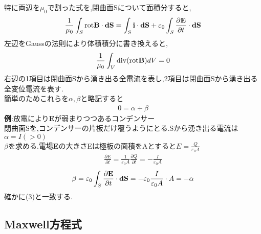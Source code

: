 \documentclass{jsarticle}
\begin{document}
特に両辺を$\mu_0$で割った式を,閉曲面Sについて面積分すると,
\begin{eqnarray*}
\frac{1}{\mu_0} \int_{S} {\rm rot} {\bf B} \cdot {\bf dS} = \int_{S} {\bf i} \cdot {\bf dS} + \varepsilon_0 \int_{S} \frac{\partial {\bf E}}{\partial t} \cdot {\bf dS}
\end{eqnarray*}
左辺をGaussの法則により体積積分に書き換えると,
\begin{eqnarray*}
\frac{1}{\mu_0} \int_{V} {\rm div}({\rm rot} {\bf B}) dV = 0
\end{eqnarray*}
右辺の1項目は閉曲面Sから湧き出る全電流を表し,2項目は閉曲面Sから湧き出る全変位電流を表す. \\
簡単のためこれらを$\alpha,\beta$と略記すると
\begin{eqnarray}
0=\alpha + \beta
\end{eqnarray}
{\bf 例}:放電により{\bf E}が弱まりつつあるコンデンサー \\
閉曲面Sを,コンデンサーの片板だけ覆うようにとる.Sから湧き出る電流は$\alpha = I(>0)$ \\
$\beta$を求める.電場{\bf E}の大きさEは極板の面積をAとすると$E=\frac{Q}{\varepsilon_0 A}$ \\
\begin{eqnarray*}
\frac{\partial E}{\partial t} = \frac{1}{\varepsilon_0 A} \frac{\partial Q}{\partial t} = - \frac{I}{\varepsilon_0 A}
\end{eqnarray*}
\begin{eqnarray*}
\beta = \varepsilon_0 \int_{S} \frac{\partial {\bf E}}{\partial t} \cdot {\bf dS} = - \varepsilon_0 \frac{I}{\varepsilon_0 A} \cdot A = -\alpha
\end{eqnarray*}
確かに(3)と一致する.

\subsection{Maxwell方程式}
\end{document}

